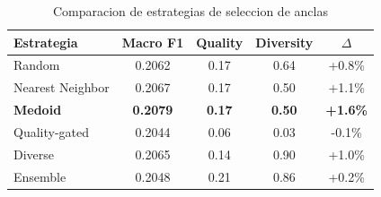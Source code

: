 
\begin{table}[h]
\centering
\caption{Comparacion de estrategias de seleccion de anclas}
\label{tab:anchor_strategies}
\begin{tabular}{lcccc}
\hline
Estrategia & Macro F1 & Quality & Diversity & $\Delta$ \\
\hline
Random & 0.2062 & 0.17 & 0.64 & +0.8\% \\
Nearest Neighbor & 0.2067 & 0.17 & 0.50 & +1.1\% \\
\textbf{Medoid} & \textbf{0.2079} & \textbf{0.17} & \textbf{0.50} & \textbf{+1.6\%} \\
Quality-gated & 0.2044 & 0.06 & 0.03 & -0.1\% \\
Diverse & 0.2065 & 0.14 & 0.90 & +1.0\% \\
Ensemble & 0.2048 & 0.21 & 0.86 & +0.2\% \\

\hline
\end{tabular}
\end{table}
